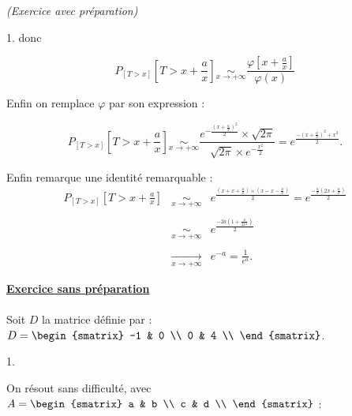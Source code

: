 \documentclass[11pt]{article}%
\begin{document}
\begin{exercice}{\it (Exercice avec préparation)}
\begin{noliste}{1.}
 donc
 
\[
 P_{ [T > x ] } \left[ T > x + \frac{ a }{ x } \right] \underset{ x
\rightarrow + \infty }{ \sim } \frac{ \varphi \left[ x + \frac{ a }{ x
} \right] }{ \varphi (x) } 
\]

 Enfin on remplace $\varphi$ par son expression : 
 
\[
 P_{ [T > x ] } \left[ T > x + \frac{ a }{ x } \right] \underset{ x
\rightarrow + \infty }{ \sim } \frac{ e^{ - \frac{ \left( x + \frac{ a
}{ x } \right)^{2} }{2} } \times \sqrt{ 2 \pi } }{ \sqrt{ 2 \pi }
\times e^{ - \frac{ x^{2} }{ 2 } } } = e^{ \frac{ - \left( x + \frac{ a
}{ x } \right)^{2} + x^{2} }{2} }. 
\]

 Enfin remarque une identité remarquable : 
 \begin{eqnarray*}
 P_{ [T > x ] } \left[ T > x + \frac{ a }{ x } \right] & \underset{ x
\rightarrow + \infty }{ \sim } & e^{ \frac{ \left( x + x + \frac{ a }{
x } \right) \times \left( x - x - \frac{a }{ x } \right) }{2} } = e^{
\frac{ - \frac{ a }{ x } \left( 2 x + \frac{ a }{ x } \right) }{2} } \\
\\
 & \underset{ x \rightarrow + \infty }{ \sim } & e^{ \frac{ - 2 a
\left( 1 + \frac{ a }{ 2 x^{2} } \right) }{2} } \\
\\
 & \xrightarrow[ x \rightarrow + \infty ]{} & e^{ - a } = \frac{ 1 }{
e^{a} }. \end{eqnarray*}

 \end{noliste}

 \noindent \textbf{\underline{Exercice sans préparation}} \\
\\
 Soit $D$ la matrice définie par : $ D = \begin{smatrix}
-1 & 0 \\
0 & 4 \\
\end{smatrix}
$.
 \begin{noliste}{1.}
 \setlength{\itemsep}{4mm}
 \item On résout sans difficulté, avec $A = \begin{smatrix}
a & b \\
c & d \\
\end{smatrix}
$ : 
 

\end{noliste}
\end{exercice}
\end{document}
